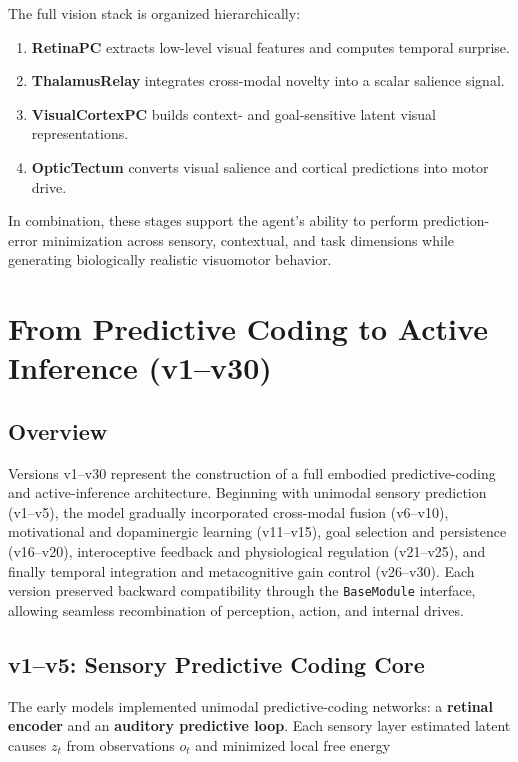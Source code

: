 \documentclass[9pt]{elife}
\begin{document}
The full vision stack is organized hierarchically:
\begin{enumerate}
    \item \textbf{RetinaPC} extracts low-level visual features and computes temporal surprise.
    \item \textbf{ThalamusRelay} integrates cross-modal novelty into a scalar salience signal.
    \item \textbf{VisualCortexPC} builds context- and goal-sensitive latent visual representations.
    \item \textbf{OpticTectum} converts visual salience and cortical predictions into motor drive.
\end{enumerate}

In combination, these stages support the agent's ability to perform
prediction-error minimization across sensory, contextual, and task dimensions
while generating biologically realistic visuomotor behavior.


\section{From Predictive Coding to Active Inference (v1–v30)}

\subsection{Overview}

Versions v1–v30 represent the construction of a full embodied predictive-coding and active-inference architecture.
Beginning with unimodal sensory prediction (v1–v5), the model gradually incorporated cross-modal fusion (v6–v10),
motivational and dopaminergic learning (v11–v15),
goal selection and persistence (v16–v20),
interoceptive feedback and physiological regulation (v21–v25),
and finally temporal integration and metacognitive gain control (v26–v30).
Each version preserved backward compatibility through the \texttt{BaseModule} interface,
allowing seamless recombination of perception, action, and internal drives.

\subsection{v1–v5: Sensory Predictive Coding Core}

The early models implemented unimodal predictive-coding networks:
a \textbf{retinal encoder} and an \textbf{auditory predictive loop}.
Each sensory layer estimated latent causes $z_t$ from observations $o_t$
and minimized local free energy
\end{document}
